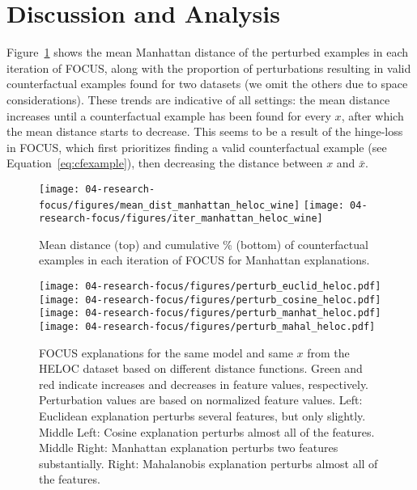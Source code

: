 
\section{Discussion and Analysis}
\label{section:case-study}

Figure~\ref{fig:distances} shows the mean Manhattan distance of the perturbed examples in each iteration of FOCUS, along with the proportion of perturbations resulting in valid counterfactual examples found for two datasets (we omit the others due to space considerations). These trends are indicative of all settings: the mean distance increases until a counterfactual example has been found for every $x$, after which the mean distance starts to decrease. This seems to be a result of the hinge-loss in FOCUS, which first prioritizes finding a valid counterfactual example (see Equation~\ref{eq:cfexample}), then decreasing the distance between $x$ and $\bar{x}$. 

\begin{figure}[t]
\begin{center}
\texttt{[image: 04-research-focus/figures/mean\_dist\_manhattan\_heloc\_wine]} 
\texttt{[image: 04-research-focus/figures/iter\_manhattan\_heloc\_wine]} 
\end{center}
\caption{Mean distance (top) and cumulative \% (bottom) of counterfactual examples in each iteration of FOCUS for Manhattan explanations.}
\label{fig:distances}
\end{figure}



\begin{figure*}[h!]
\centering
\texttt{[image: 04-research-focus/figures/perturb\_euclid\_heloc.pdf]}
\texttt{[image: 04-research-focus/figures/perturb\_cosine\_heloc.pdf]} 
\texttt{[image: 04-research-focus/figures/perturb\_manhat\_heloc.pdf]} 
\texttt{[image: 04-research-focus/figures/perturb\_mahal\_heloc.pdf]} 
\caption{FOCUS explanations for the same model and same $x$ from the \textsc{HELOC} dataset based on different distance functions. 
Green and red indicate increases and decreases in feature values, respectively. 
Perturbation values are based on normalized feature values. 
Left: Euclidean explanation perturbs several features, but only slightly. 
Middle Left: Cosine explanation perturbs almost all of the features. 
Middle Right: Manhattan explanation perturbs two features substantially.
Right: Mahalanobis explanation perturbs almost all of the features. 
}
\label{fig:perturb-examples}
\end{figure*}

